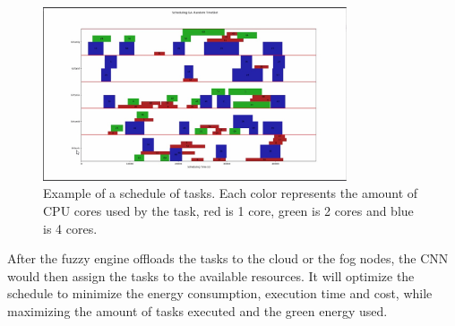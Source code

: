 \begin{figure}[H]
	\centering
	\includegraphics[width=0.8\textwidth]{../images/schedule.jpg}
	\caption{Example of a schedule of tasks. Each color represents the amount of CPU cores used by the task, red is 1 core,
		green is 2 cores and blue is 4 cores.}
	\label{fig:schedule}
\end{figure}

After the fuzzy engine offloads the tasks to the cloud or the fog nodes, the CNN would then assign the tasks to the
available resources. It will optimize the schedule to minimize the energy consumption, execution time and cost, while
maximizing the amount of tasks executed and the green energy used.